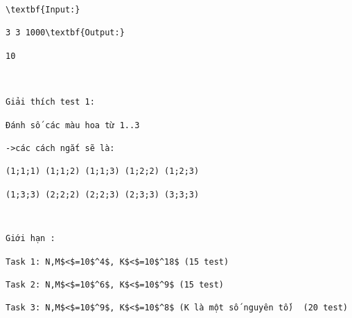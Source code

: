 \begin{verbatim}
\textbf{Input:}

3 3 1000\textbf{Output:}

10

 

Giải thích test 1:

Đánh số các màu hoa từ 1..3

->các cách ngắt sẽ là:

(1;1;1) (1;1;2) (1;1;3) (1;2;2) (1;2;3)

(1;3;3) (2;2;2) (2;2;3) (2;3;3) (3;3;3)\end{verbatim}
\begin{verbatim}


Giới hạn :

Task 1: N,M$<$=10$^4$, K$<$=10$^18$ (15 test)

Task 2: N,M$<$=10$^6$, K$<$=10$^9$ (15 test)

Task 3: N,M$<$=10$^9$, K$<$=10$^8$ (K là một số nguyên tố)  (20 test)\end{verbatim}